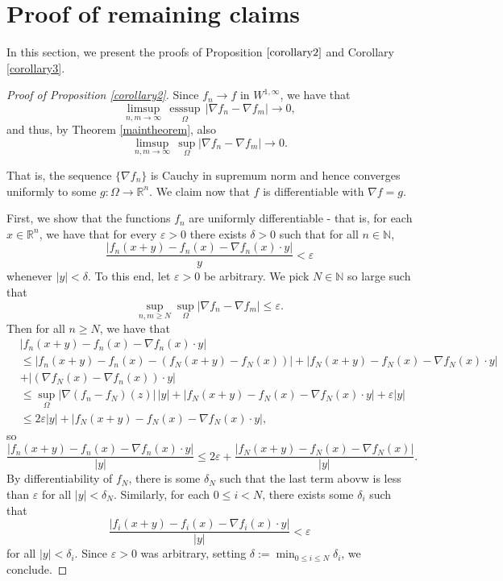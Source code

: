 \documentclass{article}
\DeclareMathOperator{\esssup}{esssup}
\begin{document}
\section{Proof of remaining claims}
In this section, we present the proofs of Proposition $\ref{corollary2}$ and Corollary \ref{corollary3}. 

\begin{proof}[Proof of Proposition \ref{corollary2}] 

Since $f_n \to f$ in $W^{1, \infty}$, we have that 
$$\limsup_{n, m \to \infty} \, \underset{\Omega}{\esssup} \, |\nabla f_n - \nabla f_m| \to 0,$$
and thus, by Theorem \ref{maintheorem}, also
$$\limsup_{n, m \to \infty} \,  \sup_{\Omega} |\nabla f_n - \nabla f_m| \to 0.$$

\noindent That is, the sequence $\{\nabla f_n\}$ is Cauchy in supremum norm and hence converges uniformly to some $g: \Omega \to \mathbb R^n$. We claim now that $f$ is differentiable with $\nabla f = g$.

First, we show that the functions $f_n$ are uniformly differentiable - that is, for each $x \in \mathbb R^n$, we have that for every $\varepsilon > 0$ there exists $\delta > 0$ such that for all $n \in \mathbb N$,
\begin{equation}\label{unifdif}\frac{|f_n (x+y) - f_n (x) - \nabla f_n(x) \cdot y|}{y} < \varepsilon\end{equation}
whenever $|y| < \delta$. To this end, let $\varepsilon > 0$ be arbitrary. We pick $N \in \mathbb N$ so large such that
$$\sup_{n, m \geq N} \sup_{\Omega} |\nabla f_n - \nabla f_m| \leq \varepsilon.$$
Then for all $n \geq N$, we have that
$$\begin{aligned}&|f_n (x+y) - f_n (x) - \nabla f_n(x) \cdot y| \\
& \leq |f_n (x+y) - f_n (x) - (f_N (x+y) - f_N (x))| + |f_N (x+y) - f_N (x) - \nabla f_N (x) \cdot y| \\
&+ |(\nabla f_N(x) - \nabla f_n (x)) \cdot y| \\
& \leq \sup_\Omega |\nabla(f_n - f_N)(z)| \,  |y| + |f_N (x+y) - f_N (x) - \nabla f_N (x) \cdot y| + \varepsilon |y| \\
& \leq 2 \varepsilon |y| + |f_N (x+y) - f_N (x) - \nabla f_N (x) \cdot y|,\end{aligned}$$
so
$$\frac{|f_n (x+y) - f_n (x) - \nabla f_n (x)\cdot y|}{|y|} \leq 2\varepsilon + \frac{|f_N (x+y) - f_N (x) - \nabla f_N (x)|}{|y|}.$$
By differentiability of $f_N$, there is some $\delta_N$ such that the last term abovw is less than $\varepsilon$ for all $|y| < \delta_N$. Similarly, for each $0 \leq i < N$, there exists some $\delta_i$ such that 
$$\frac{|f_i (x+y) - f_i (x) - \nabla f_i (x) \cdot y|}{|y|} < \varepsilon$$
for all $|y| < \delta_i.$ Since $\varepsilon > 0$ was arbitrary, setting $\delta := \min_{0 \leq i \leq N} \delta_i$, we conclude.



\end{proof}
\end{document}

